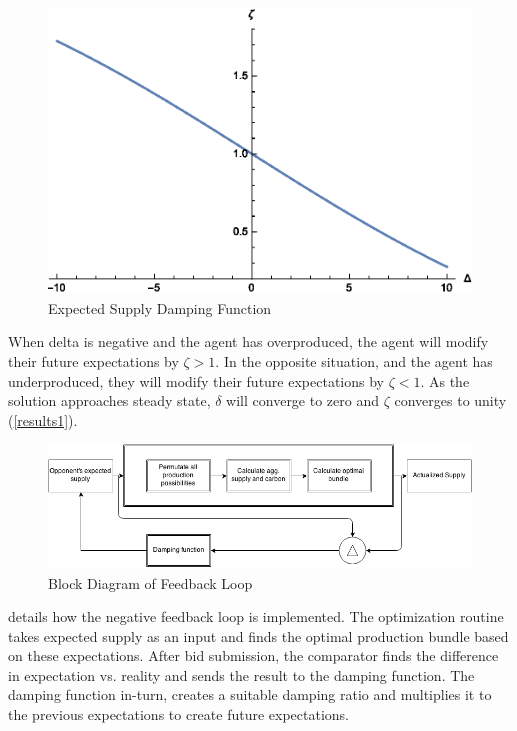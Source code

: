 \documentclass[12pt]{article}
\begin{document}
	\begin{figure}[ht!]
		\begin{center}
		\includegraphics[scale = .6]{DF.eps}
		\caption{Expected Supply Damping Function}
		\end{center}
	\end{figure}

When delta is negative and the agent has overproduced, the agent will modify their future expectations by $\zeta > 1$. In the opposite situation, and the agent has underproduced, they will modify their future expectations by $\zeta < 1$. As the solution approaches steady state, $\delta$ will converge to zero and $\zeta$ converges to unity (\cref{results1}). 

	\begin{figure}[ht!]
		\begin{center}
		\includegraphics[scale = .6]{feedbackloop.png}
		\caption{Block Diagram of Feedback Loop}
		\label{feedback}
		\end{center}
	\end{figure}

  details how the negative feedback loop is implemented. The optimization routine takes expected supply as an input and finds the optimal production bundle based on these expectations. After bid submission, the comparator finds the difference in expectation vs. reality and sends the result to the damping function. The damping function in-turn, creates a suitable damping ratio and multiplies it to the previous expectations to create future expectations. 
\end{document}
